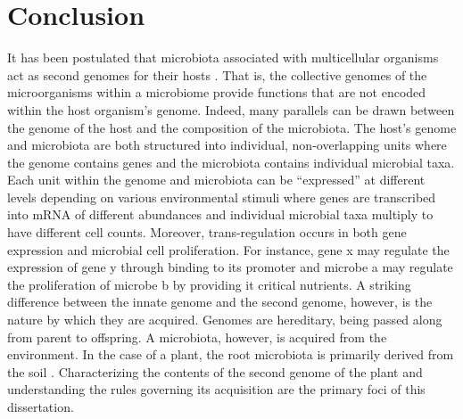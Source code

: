 \chapter{Conclusion}
It has been postulated that microbiota associated with multicellular organisms act as second genomes for their hosts \cite{grice2012human}. That is, the collective genomes of the microorganisms within a microbiome provide functions that are not encoded within the host organism’s genome. Indeed, many parallels can be drawn between the genome of the host and the composition of the microbiota. The host’s genome and microbiota are both structured into individual, non-overlapping units where the genome contains genes and the microbiota contains individual microbial taxa. Each unit within the genome and microbiota can be “expressed” at different levels depending on various environmental stimuli where genes are transcribed into mRNA of different abundances and individual microbial taxa multiply to have different cell counts. Moreover, trans-regulation occurs in both gene expression and microbial cell pro{}liferation. For instance, gene x may regulate the expression of gene y through binding to its promoter and microbe a may regulate the proliferation of microbe b by providing it critical nutrients. A striking difference between the innate genome and the second genome, however, is the nature by which they are acquired. Genomes are hereditary, being passed along from parent to offspring. A microbiota, however, is acquired from the environment. In the case of a plant, the root microbiota is primarily derived from the soil \cite{Zarraonaindia2015}. Characterizing the contents of the second genome of the plant and understanding the rules governing its acquisition are the primary foci of this dissertation.

